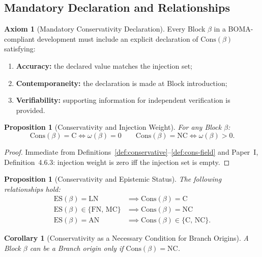 \documentclass[12pt, a4paper]{article}
\theoremstyle{plain}
\newtheorem{proposition}[theorem]{Proposition}
\newtheorem{corollary}[theorem]{Corollary}
\theoremstyle{definition}
\newtheorem{axiom}[theorem]{Axiom}
\theoremstyle{remark}
\newcommand{\BOMA}{\textsf{BOMA}}
\newcommand{\IW}[1]{\omega(#1)}
\newcommand{\ES}[1]{\mathrm{ES}(#1)}
\newcommand{\Cons}[1]{\mathrm{Cons}(#1)}
\newcommand{\LN}{\mathrm{LN}}
\newcommand{\FN}{\mathrm{FN}}
\newcommand{\AN}{\mathrm{AN}}
\newcommand{\MC}{\mathrm{MC}}
\newcommand{\C}{\mathrm{C}}
\newcommand{\NC}{\mathrm{NC}}
\begin{document}
\subsection{Mandatory Declaration and Relationships}
\label{subsec:cons-mandatory}

\begin{axiom}[Mandatory Conservativity Declaration]
\label{ax:cons}
Every Block $\beta$ in a \BOMA{}-compliant development must include
an explicit declaration of $\Cons{\beta}$ satisfying:
\begin{enumerate}
  \item \textbf{Accuracy:} the declared value matches the injection
        set;
  \item \textbf{Contemporaneity:} the declaration is made at Block
        introduction;
  \item \textbf{Verifiability:} supporting information for
        independent verification is provided.
\end{enumerate}
\end{axiom}

\begin{proposition}[Conservativity and Injection Weight]
\label{prop:cons-iw}
For any Block $\beta$:
\[
  \Cons{\beta} = \C \iff \IW{\beta} = 0 \qquad
  \Cons{\beta} = \NC \iff \IW{\beta} > 0.
\]
\end{proposition}

\begin{proof}
Immediate from Definitions~\ref{def:conservative}--\ref{def:cons-field}
and Paper~I, Definition~4.6.3: injection weight is zero iff the
injection set is empty.
\end{proof}

\begin{proposition}[Conservativity and Epistemic Status]
\label{prop:cons-es}
The following relationships hold:
\begin{align*}
  \ES{\beta} = \LN &\implies \Cons{\beta} = \C \\
  \ES{\beta} \in \{\FN,\,\MC\} &\implies \Cons{\beta} = \NC \\
  \ES{\beta} = \AN &\implies \Cons{\beta} \in \{\C,\,\NC\}.
\end{align*}
\end{proposition}

\begin{corollary}[Conservativity as a Necessary Condition for Branch Origins]
\label{cor:cons-branch}
A Block $\beta$ can be a Branch origin only if $\Cons{\beta} = \NC$.
\end{corollary}
\end{document}
